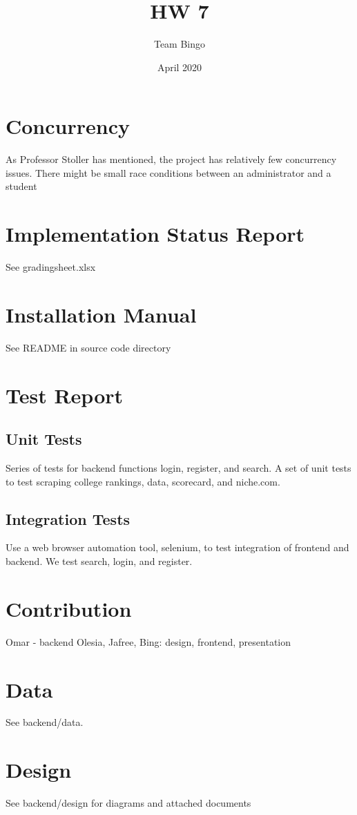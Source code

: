 \documentclass{article}
\title{HW 7}
\author{Team Bingo}
\date{April 2020}
\begin{document}
\maketitle

\section{Concurrency}
As Professor Stoller has mentioned, the project has relatively few concurrency
issues. There might be small race conditions between an administrator and a student 



\section{Implementation Status Report}
See gradingsheet.xlsx 

\section{Installation Manual}
See README in source code directory

\section{Test Report}
\subsection{Unit Tests}
Series of tests for backend functions login, register, and search.
A set of unit tests to test scraping college rankings, data, scorecard, and
niche.com. 

\subsection{Integration Tests}
Use a web browser automation tool, selenium, to test integration of frontend and
backend. We test search, login, and register.

\section{Contribution}
Omar - backend 
Olesia, Jafree, Bing: design, frontend, presentation

\section{Data}
See backend/data.

\section{Design}
See backend/design for diagrams and attached documents
\end{document}
